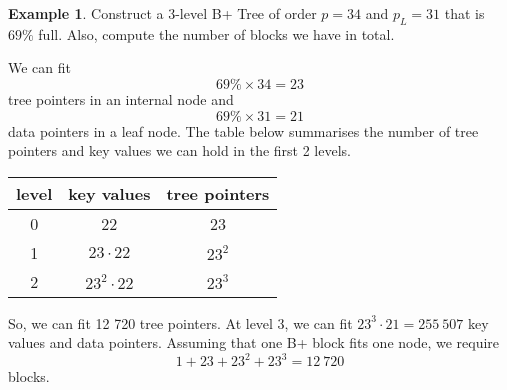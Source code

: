 \documentclass[a4paper, openany]{memoir}
\theoremstyle{definition}
\newtheorem{example}[subsection]{Example}
\begin{document}
\begin{example}
    Construct a 3-level B+ Tree of order $p = 34$ and $p_L = 31$ that is $69\%$ full. Also, compute the number of blocks we have in total.
\end{example}
\begin{answer}
    We can fit 
    \[69\% \times 34 = 23\]
    tree pointers in an internal node and 
    \[69\% \times 31 = 21\]
    data pointers in a leaf node. The table below summarises the number of tree pointers and key values we can hold in the first 2 levels.
    \begin{table}[H]
        \centering
        \begin{tabular}{|c|c|c|}
            \hline
            level & key values & tree pointers \\
            \hline
            0 & 22 & 23 \\
            1 & $23 \cdot 22$ & $23^2$ \\
            2 & $23^2 \cdot 22$ & $23^3$ \\
            \hline
        \end{tabular}
    \end{table}
    \noindent So, we can fit 12 720 tree pointers. At level 3, we can fit $23^3 \cdot 21 = 255 \ 507$ key values and data pointers. Assuming that one B+ block fits one node, we require
    \[1 + 23 + 23^2 + 23^3 = 12 \ 720\]
    blocks.
\end{answer}
\end{document}
